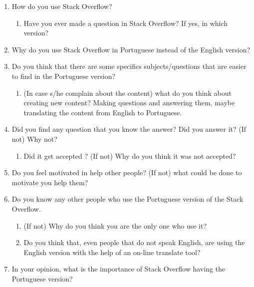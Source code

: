 \begin{enumerate}
	\item How do you use Stack Overflow?
	\begin{enumerate}
		\item Have you ever made a question in Stack Overflow? If yes, in which version?
	\end{enumerate}
	
	\item Why do you use Stack Overflow in Portuguese instead of the English version?
	
	\item Do you think that there are some specifics subjects/questions that are easier to find in the Portuguese version?
	\begin{enumerate}
		\item (In case s/he complain about the content) what do you think about creating new content? Making questions and answering them, maybe translating the content from English to Portuguese. 
	\end{enumerate}
	
	\item Did you find any question that you know the answer? Did you answer it? (If not) Why not?
	\begin{enumerate}
		\item Did it get accepted ? (If not) Why do you think it was not accepted?
	\end{enumerate}
	
	\item Do you feel motivated in help other people? (If not) what could be done to motivate you help them?
	
	\item Do you know any other people who use the Portuguese version of the Stack Overflow.
	\begin{enumerate}
		\item (If not) Why do you think you are the only one who use it?
		\item Do you think that, even people that do not speak English, are using the English version with the help of an on-line translate tool?
	\end{enumerate}
	
	\item In your opinion, what is the importance of Stack Overflow having the Portuguese version?
\end{enumerate}


